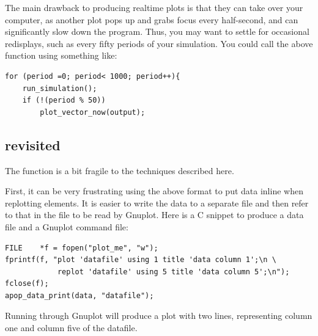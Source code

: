 The main drawback to producing realtime plots is that they can take over
your computer, as another plot pops up and grabs focus every half-second, and can significantly slow down the program.
Thus, you may want to settle for occasional redisplays, such as every
fifty periods of your simulation. You could call the above
function using something like:

\begin{lstlisting}
for (period =0; period< 1000; period++){
    run_simulation();
    if (!(period % 50))
        plot_vector_now(output);
\end{lstlisting}


\subsection{\treesymbol{}  revisited}\label{replottwo}
The  function is a bit fragile to the techniques described
here.

First, it can be very frustrating using the above  format
to put data inline when replotting elements. It is easier to write the
data to a separate file and then refer to that in the file to be read
by Gnuplot. Here is a C snippet to produce a data file and a Gnuplot
command file:
\begin{lstlisting}
FILE    *f = fopen("plot_me", "w");
fprintf(f, "plot 'datafile' using 1 title 'data column 1';\n \
            replot 'datafile' using 5 title 'data column 5';\n");
fclose(f);
apop_data_print(data, "datafile");
\end{lstlisting}
Running  through Gnuplot will produce a plot with two lines,
representing column one and column five of the datafile.

